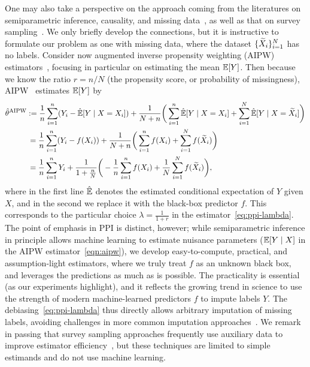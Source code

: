 One may also take a perspective on the \ppipp approach coming from the
literatures on semiparametric inference, causality, and missing
data~\cite{RobinsRo95, BickelKlRiWe98, RobinsRoZh94, Tsiatis06,
  ChernozhukovChDeDuHaNeRo16}, as well as that on survey
sampling~\cite{SarndalSwWr03}.  We only briefly develop the connections, but
it is instructive to formulate our problem as one with missing data, where
the dataset $\{\widetilde X_i\}_{i=1}^N$ has no labels. Consider now augmented
inverse propensity weighting (AIPW) estimators~\cite{RobinsRo95, Tsiatis06},
focusing in particular on estimating the mean $\mathbb{E}[Y]$. Then because we know
the ratio $r = n/N$ (the propensity score, or probability of missingness), AIPW~\cite{RobinsRo95, Tsiatis06}
estimates $\mathbb{E}[Y]$ by
\begin{align}
  \hat{\theta}^{\textup{AIPW}} & := \frac{1}{n} \sum_{i = 1}^n
  (Y_i - \hat{\mathbb{E}}[Y \mid X = X_i])
  + \frac{1}{N + n} \bigg(\sum_{i = 1}^n \hat{\mathbb{E}}[Y \mid X = X_i]
  + \sum_{i = 1}^N \hat{\mathbb{E}}[Y \mid X = \widetilde{X}_i]\bigg) \nonumber \\
  & \, = \frac{1}{n} \sum_{i = 1}^n
  (Y_i - f(X_i))
  + \frac{1}{N + n} \bigg(\sum_{i = 1}^n f(X_i)
  + \sum_{i = 1}^N f(\widetilde{X}_i)\bigg)   \label{eqn:aipw}
  \\
  & \, = \frac{1}{n} \sum_{i = 1}^n
  Y_i 
  + \frac{1}{1 + \frac n N} \bigg(-\frac 1 n \sum_{i = 1}^n f(X_i)
  + \frac 1 N \sum_{i = 1}^N f(\widetilde{X}_i)\bigg),
  \nonumber
\end{align}
where in the first line $\hat{\mathbb{E}}$ denotes the estimated conditional
expectation of $Y$ given $X$, and in the second we replace it with the
black-box predictor $f$.
%
This corresponds to the particular choice $\lambda = \frac{1}{1 + r}$ in the
\ppipp estimator~\eqref{eq:ppi-lambda}.
%
The point of emphasis in PPI is distinct, however; while semiparametric
inference in principle allows machine learning to estimate nuisance
parameters ($\mathbb{E}[Y \mid X]$ in the AIPW estimator~\eqref{eqn:aipw}), we
develop easy-to-compute, practical, and assumption-light estimators, where
we truly treat $f$ as an unknown black box, and \ppipp leverages the
predictions as much as is possible.
%
The practicality is essential (as our experiments highlight), and it
reflects the growing trend in science to use the strength of modern
machine-learned predictors $f$ to impute labels $Y$.
%
The debiasing~\eqref{eq:ppi-lambda} thus directly allows arbitrary
imputation of missing labels, avoiding challenges in more common imputation
approaches~\cite{Rubin18}.
%
We remark in passing that survey sampling approaches frequently use
auxiliary data to improve estimator efficiency~\cite{SarndalSwWr03}, but
these techniques are limited to simple estimands and do not use machine
learning.
%

